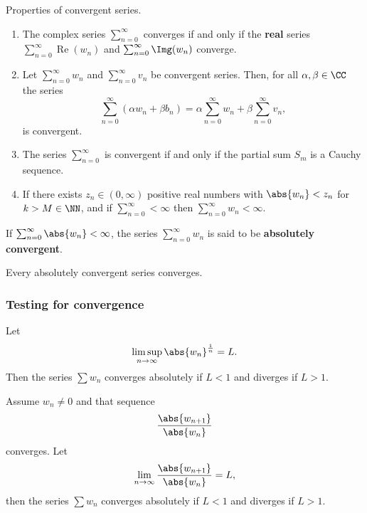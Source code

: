 \documentclass[12pt, a4paper]{article}
\DeclareMathOperator{\R}{Re}
\begin{document}
\begin{mdprop}
    Properties of convergent series.
    \begin{enumerate}
        \item The complex series \(\sum_{n=0}^{\infty}\) converges if and only if the \textbf{real} series \(\sum_{n=0}^{\infty} \R(w_n)\) and \(\sum_{n=0}^{\infty} \Img(w_n)\) converge.
        \item Let \(\sum_{n=0}^{\infty} w_n\) and \(\sum_{n=0}^{\infty} v_n\) be convergent series. Then, for all \(\alpha,\beta \in \CC\) the series 
        \[\sum_{n=0}^{\infty} (\alpha w_n +\beta b_n) =\alpha\sum_{n=0}^{\infty}w_n +\beta\sum_{n=0}^{\infty} v_n,\]
        is convergent.
        \item The series \(\sum_{n=0}^{\infty}\) is convergent if and only if the partial sum \(S_m\) is a Cauchy sequence.
        \item If there exists \(z_n \in (0,\infty)\) positive real numbers with \(\abs{w_n}<z_n\) for \(k>M\in \NN\), and if \(\sum_{n=0}^{\infty}<\infty\) then \(\sum_{n=0}^{\infty} w_n <\infty\).
    \end{enumerate}
\end{mdprop}

\begin{definition}
    If \(\sum_{n=0}^{\infty} \abs{w_n} < \infty\), the series \(\sum_{n=0}^{\infty} w_n\) is said to be \textbf{absolutely convergent}.
\end{definition}

\begin{corollary}
    Every absolutely convergent series converges.
\end{corollary}

\subsubsection{Testing for convergence}

\begin{proposition}
    Let 
    \[\limsup_{n \to \infty} \abs{w_n}^{\frac{1}{n}} = L.\]
    Then the series \(\sum w_n\) converges absolutely if \(L<1\) and diverges if \(L>1\).
\end{proposition}

\begin{proposition}
    Assume \(w_n \neq 0\) and that sequence 
    \[\frac{\abs{w_{n+1}}}{\abs{w_n}}\] 
    converges. Let 
    \[\lim_{n\to \infty} \frac{\abs{w_{n+1}}}{\abs{w_n}} = L,\]
    then the series \(\sum w_n\) converges absolutely if \(L<1\) and diverges if \(L>1\).
\end{proposition}
\end{document}
